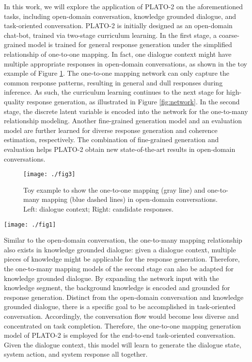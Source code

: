 \documentclass[letterpaper]{article} \usepackage{aaai21}  \usepackage{times}  \usepackage{helvet} \usepackage{courier}  \usepackage[hyphens]{url}  \usepackage{graphicx} \urlstyle{rm} \def\UrlFont{\rm}  \usepackage{natbib}  \usepackage{caption} \frenchspacing  \setlength{\pdfpagewidth}{8.5in}  \setlength{\pdfpageheight}{11in}  \usepackage{amsmath}
\begin{document}
In this work, we will explore the application of PLATO-2 \cite{bao2020plato} on the aforementioned tasks, including open-domain conversation, knowledge grounded dialogue, and task-oriented conversation. PLATO-2 is initially designed as an open-domain chat-bot\footnotemark[1], trained via two-stage curriculum learning. In the first stage, a coarse-grained model is trained for general response generation under the simplified relationship of one-to-one mapping. In fact, one dialogue context might have multiple appropriate responses in open-domain conversations, as shown in the toy example of Figure \ref{fig:toy}. The one-to-one mapping network can only capture the common response patterns, resulting in general and dull responses during inference. As such, the curriculum learning continues to the next stage for high-quality response generation, as illustrated in Figure \ref{fig:network}. In the second stage, the discrete latent variable is encoded into the network for the one-to-many relationship modeling. Another fine-grained generation model and an evaluation model are further learned for diverse response generation and coherence estimation, respectively. The combination of fine-grained generation and evaluation helps PLATO-2 obtain new state-of-the-art results in open-domain conversations.
\begin{figure}
	\centering
	\texttt{[image: ./fig3]}
	\caption{Toy example to show the one-to-one mapping (gray line) and one-to-many mapping (blue dashed lines) in open-domain conversations. Left: dialogue context; Right: candidate responses.}
	\label{fig:toy}
\end{figure} 
\begin{figure*}
	\centering
	\texttt{[image: ./fig1]}
	\setlength{\abovecaptionskip}{-4pt}
	\setlength{\belowcaptionskip}{-8pt}
	\caption{PLATO-2 illustration. (a) Network overview with the details of transformer blocks. (b) Curriculum learning process with self-attention visualization and training objectives.}
	\label{fig:network}
\end{figure*}

Similar to the open-domain conversation, the one-to-many mapping relationship also exists in knowledge grounded dialogue: given a dialogue context, multiple pieces of knowledge might be applicable for the response generation. Therefore, the one-to-many mapping models of the second stage can also be adapted for knowledge grounded dialogue. By expanding the network input with the knowledge segment, the background knowledge is encoded and grounded for response generation. Distinct from the open-domain conversation and knowledge grounded dialogue, there is a specific goal to be accomplished in task-oriented conversation. Accordingly, the conversation flow would become less diverse and concentrated on task completion. Therefore, the one-to-one mapping generation model of PLATO-2 is employed for the end-to-end task-oriented conversation. Given the dialogue context, this model will learn to generate the dialogue state, system action, and system response all together. 
\end{document}

